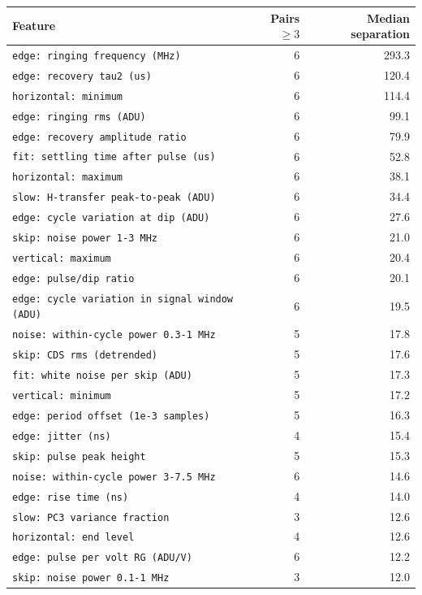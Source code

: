 \documentclass[10pt]{article}
\begin{document}
\begin{longtable}{>{\raggedright\arraybackslash}p{}rr}
\toprule Feature & Pairs $\geq 3$ & Median separation \\ \midrule \endhead
\bottomrule \endfoot
\texttt{edge: ringing frequency (MHz)} & 6 & 293.3 \\
\texttt{edge: recovery tau2 (us)} & 6 & 120.4 \\
\texttt{horizontal: minimum} & 6 & 114.4 \\
\texttt{edge: ringing rms (ADU)} & 6 & 99.1 \\
\texttt{edge: recovery amplitude ratio} & 6 & 79.9 \\
\texttt{fit: settling time after pulse (us)} & 6 & 52.8 \\
\texttt{horizontal: maximum} & 6 & 38.1 \\
\texttt{slow: H-transfer peak-to-peak (ADU)} & 6 & 34.4 \\
\texttt{edge: cycle variation at dip (ADU)} & 6 & 27.6 \\
\texttt{skip: noise power 1-3 MHz} & 6 & 21.0 \\
\texttt{vertical: maximum} & 6 & 20.4 \\
\texttt{edge: pulse/dip ratio} & 6 & 20.1 \\
\texttt{edge: cycle variation in signal window (ADU)} & 6 & 19.5 \\
\texttt{noise: within-cycle power 0.3-1 MHz} & 5 & 17.8 \\
\texttt{skip: CDS rms (detrended)} & 5 & 17.6 \\
\texttt{fit: white noise per skip (ADU)} & 5 & 17.3 \\
\texttt{vertical: minimum} & 5 & 17.2 \\
\texttt{edge: period offset (1e-3 samples)} & 5 & 16.3 \\
\texttt{edge: jitter (ns)} & 4 & 15.4 \\
\texttt{skip: pulse peak height} & 5 & 15.3 \\
\texttt{noise: within-cycle power 3-7.5 MHz} & 6 & 14.6 \\
\texttt{edge: rise time (ns)} & 4 & 14.0 \\
\texttt{slow: PC3 variance fraction} & 3 & 12.6 \\
\texttt{horizontal: end level} & 4 & 12.6 \\
\texttt{edge: pulse per volt RG (ADU/V)} & 6 & 12.2 \\
\texttt{skip: noise power 0.1-1 MHz} & 3 & 12.0 \\

\end{longtable}
\end{document}
